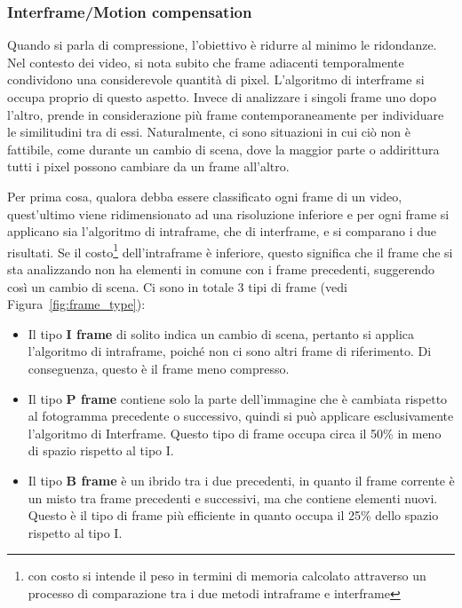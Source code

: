 \documentclass[a4paper,12pt, oneside]{article}
\begin{document}
\subsubsection{Interframe/Motion compensation}
Quando si parla di compressione, l'obiettivo è ridurre al minimo le ridondanze. Nel contesto dei video,
si nota subito che frame adiacenti temporalmente condividono una considerevole quantità di pixel.
L'algoritmo di interframe si occupa proprio di questo aspetto. Invece di analizzare i singoli frame uno
dopo l'altro, prende in considerazione più frame contemporaneamente per individuare le similitudini tra
di essi. Naturalmente, ci sono situazioni in cui ciò non è fattibile, come durante un cambio di scena,
dove la maggior parte o addirittura tutti i pixel possono cambiare da un frame all'altro.

Per prima cosa, qualora debba essere classificato ogni frame di un video, quest'ultimo viene
ridimensionato ad una risoluzione inferiore e per ogni frame si applicano sia l'algoritmo di intraframe,
che di interframe, e si comparano i due risultati. Se il costo\footnote{con costo si intende il peso
in termini di memoria calcolato attraverso un processo di comparazione tra i due metodi intraframe e interframe}
dell'intraframe è inferiore, questo
significa che il frame che si sta analizzando non ha elementi in comune con i frame precedenti,
suggerendo così un cambio di scena. Ci sono in totale 3 tipi di frame (vedi Figura~\ref{fig:frame_type}):

\begin{itemize}
  \item Il tipo \textbf{I frame} di solito indica un cambio di scena, pertanto si applica l'algoritmo
  di intraframe, poiché non ci sono altri frame di riferimento. Di conseguenza, questo è il frame meno
  compresso. 
  \item Il tipo \textbf{P frame} contiene solo la parte dell'immagine che è cambiata rispetto al fotogramma
  precedente o successivo, quindi si può applicare esclusivamente l'algoritmo di Interframe. Questo tipo di
  frame occupa circa il 50\% in meno di spazio rispetto al tipo I.
  \item Il tipo \textbf{B frame} è un ibrido tra i due precedenti, in quanto il frame corrente è un misto
  tra frame precedenti e successivi, ma che contiene elementi nuovi. Questo è il tipo di frame più
  efficiente in quanto occupa il 25\% dello spazio rispetto al tipo I.
\end{itemize}
\end{document}
